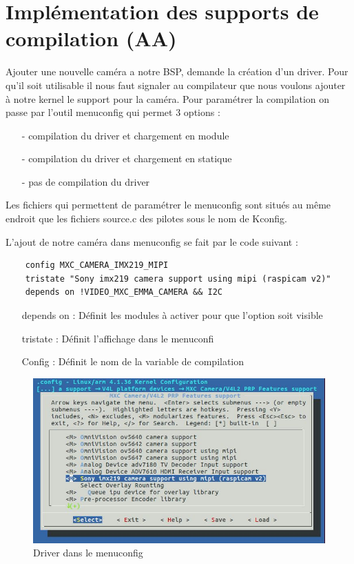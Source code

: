 \section{Implémentation des supports de compilation (AA)}

Ajouter une nouvelle caméra a notre BSP, demande la création d’un driver. Pour qu’il soit
utilisable il nous faut signaler au compilateur que nous voulons ajouter à notre kernel le
support pour la caméra. Pour paramétrer la compilation on passe par l’outil menuconfig
qui permet 3 options :

\begin{itemize}
    \item[-] compilation du driver et chargement en module
    \item[-] compilation du driver et chargement en statique
    \item[-] pas de compilation du driver
\end{itemize}

Les fichiers qui permettent de paramétrer le menuconfig sont situés au même endroit que
les fichiers source.c des pilotes sous le nom de Kconfig.

L’ajout de notre caméra dans menuconfig se fait par le code suivant :

\begin{lstlisting}
    config MXC_CAMERA_IMX219_MIPI
    tristate "Sony imx219 camera support using mipi (raspicam v2)"
    depends on !VIDEO_MXC_EMMA_CAMERA && I2C
\end{lstlisting}

\begin{itemize}
    \item[depends on : ] Définit les modules à activer pour que l’option soit visible
    \item[tristate : ] Définit l’affichage dans le menuconfi
    \item[Config : ] Définit le nom de la variable de compilation
\end{itemize}

\begin{figure}[!htb]
    \centering
    \includegraphics[trim={0cm 0cm 0cm 0cm},clip,scale=0.4]{Figures/menuconfig.png}
    \decoRule
    \caption{Driver dans le menuconfig} \label{fig:menucfg}
\end{figure}

